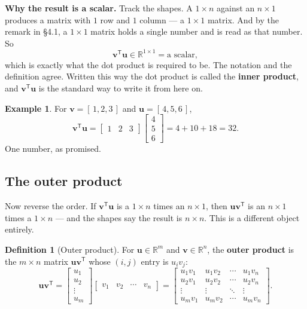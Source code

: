 \documentclass[11pt]{article}
\theoremstyle{plain}
\theoremstyle{definition}
\newtheorem{defn}{Definition}[section]
\newtheorem{ex}{Example}[section]
\theoremstyle{remark}
\newcommand{\R}{\mathbb{R}}
\newcommand{\vc}[1]{\mathbf{#1}}        %
\newcommand{\T}{^{\mathsf{T}}}          %
\begin{document}
\medskip
\noindent\textbf{Why the result is a scalar.} Track the shapes. A $1\times n$
against an $n\times1$ produces a matrix with $1$ row and $1$ column --- a
$1\times1$ matrix. And by the remark in \S4.1, a $1\times1$ matrix holds a single
number and is read as that number. So
\[
  \vc{v}\T\vc{u} \in \R^{1\times1} = \text{a scalar},
\]
which is exactly what the dot product is required to be. The notation and the
definition agree. Written this way the dot product is called the \textbf{inner
product}, and $\vc{v}\T\vc{u}$ is the standard way to write it from here on.

\begin{ex}
For $\vc{v}=[\,1,2,3\,]$ and $\vc{u}=[\,4,5,6\,]$,
\[
  \vc{v}\T\vc{u}
  =\begin{bmatrix}1&2&3\end{bmatrix}\begin{bmatrix}4\\5\\6\end{bmatrix}
  = 4+10+18 = 32 .
\]
One number, as promised.
\end{ex}

\subsection{The outer product}
Now reverse the order. If $\vc{v}\T\vc{u}$ is a $1\times n$ times an $n\times1$,
then $\vc{u}\vc{v}\T$ is an $n\times1$ times a $1\times n$ --- and the shapes
say the result is $n\times n$. This is a different object entirely.

\begin{defn}[Outer product]
For $\vc{u}\in\R^{m}$ and $\vc{v}\in\R^{n}$, the \textbf{outer product} is the
$m\times n$ matrix $\vc{u}\vc{v}\T$ whose $(i,j)$ entry is $u_iv_j$:
\[
  \vc{u}\vc{v}\T
  =\begin{bmatrix}u_1\\u_2\\\vdots\\u_m\end{bmatrix}
   \begin{bmatrix}v_1&v_2&\cdots&v_n\end{bmatrix}
  =\begin{bmatrix}
    u_1v_1 & u_1v_2 & \cdots & u_1v_n\\
    u_2v_1 & u_2v_2 & \cdots & u_2v_n\\
    \vdots & \vdots & \ddots & \vdots\\
    u_mv_1 & u_mv_2 & \cdots & u_mv_n
  \end{bmatrix} .
\]
\end{defn}
\end{document}
